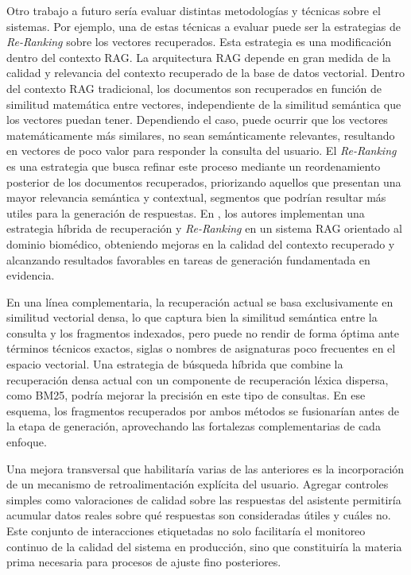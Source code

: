 Otro trabajo a futuro sería evaluar distintas metodologías y técnicas sobre el sistemas. Por ejemplo, una de estas técnicas a evaluar puede ser la estrategias de \textit{Re-Ranking} sobre los vectores recuperados. Esta estrategia es una modificación dentro del contexto RAG. La arquitectura RAG depende en gran medida de la calidad y relevancia del contexto recuperado de la base de datos vectorial. Dentro del contexto RAG tradicional, los documentos son recuperados en función de similitud matemática entre vectores, independiente de la similitud semántica que los vectores puedan tener. Dependiendo el caso, puede ocurrir que los vectores matemáticamente más similares, no sean semánticamente relevantes, resultando en vectores de poco valor para responder la consulta del usuario.  El \textit{Re-Ranking} es una estrategia que busca refinar este proceso mediante un reordenamiento posterior de los documentos recuperados, priorizando aquellos que presentan una mayor relevancia semántica y contextual, segmentos que podrían resultar más utiles para la generación de respuestas. En \cite{irany2026hybrid}, los autores implementan una estrategia híbrida de recuperación y \textit{Re-Ranking} en un sistema RAG orientado al dominio biomédico, obteniendo mejoras en la calidad del contexto recuperado y alcanzando resultados favorables en tareas de generación fundamentada en evidencia.

En una línea complementaria, la recuperación actual se basa exclusivamente en similitud vectorial densa, lo que captura bien la similitud semántica entre la consulta y los fragmentos indexados, pero puede no rendir de forma óptima ante términos técnicos exactos, siglas o nombres de asignaturas poco frecuentes en el espacio vectorial. Una estrategia de búsqueda híbrida que combine la recuperación densa actual con un componente de recuperación léxica dispersa, como BM25, podría mejorar la precisión en este tipo de consultas. En ese esquema, los fragmentos recuperados por ambos métodos se fusionarían antes de la etapa de generación, aprovechando las fortalezas complementarias de cada enfoque.

Una mejora transversal que habilitaría varias de las anteriores es la incorporación de un mecanismo de retroalimentación explícita del usuario. Agregar controles simples como valoraciones de calidad sobre las respuestas del asistente permitiría acumular datos reales sobre qué respuestas son consideradas útiles y cuáles no. Este conjunto de interacciones etiquetadas no solo facilitaría el monitoreo continuo de la calidad del sistema en producción, sino que constituiría la materia prima necesaria para procesos de ajuste fino posteriores.

